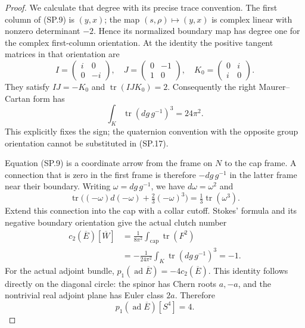 \begin{proof}
We calculate that degree with its precise trace convention. The
first column of (SP.9) is \((y,x)\); the map
\((s,\rho)\mapsto(y,x)\) is complex linear with nonzero
determinant \(-2\). Hence its normalized boundary map has degree
one for the complex first-column orientation. At the identity the
positive tangent matrices in that orientation are
\[
 I=\begin{pmatrix}i&0\\0&-i\end{pmatrix},\quad
 J=\begin{pmatrix}0&-1\\1&0\end{pmatrix},\quad
 K_0=\begin{pmatrix}0&i\\i&0\end{pmatrix}.
                                                               \tag{SP.16}
\]
They satisfy \(IJ=-K_0\) and \(\operatorname{tr}(IJK_0)=2\).
Consequently the right Maurer--Cartan form has
\[
           \int_K\operatorname{tr}(dg\,g^{-1})^3=24\pi^2.
                                                               \tag{SP.17}
\]
This explicitly fixes the sign; the quaternion convention with the
opposite group orientation cannot be substituted in (SP.17).

Equation (SP.9) is a coordinate arrow from the frame on \(N\) to
the cap frame. A connection that is zero in the first frame is
therefore \(-dg\,g^{-1}\) in the latter frame near their boundary.
Writing \(\omega=dg\,g^{-1}\), we have
\(d\omega=\omega^2\) and
\[
 \operatorname{tr}\bigl((-\omega)d(-\omega)
                    +\tfrac23(-\omega)^3\bigr)
                    =\tfrac13\operatorname{tr}(\omega^3).
\]
Extend this connection into the cap with a collar cutoff. Stokes'
formula and its negative boundary orientation give the actual
clutch number
\[
 \begin{aligned}
 c_2(\overline E)[\overline W]
    &=\frac1{8\pi^2}\int_{\text{cap}}\operatorname{tr}(F^2)\\
    &=-\frac1{24\pi^2}
                       \int_K\operatorname{tr}(dg\,g^{-1})^3=-1.
 \end{aligned}                                             \tag{SP.18}
\]
For the actual adjoint bundle,
\(p_1(\operatorname{ad}\overline E)=-4c_2(\overline E)\).
This identity follows directly on the diagonal circle: the spinor
has Chern roots \(a,-a\), and the nontrivial real adjoint plane has
Euler class \(2a\). Therefore
\[
             p_1(\operatorname{ad}\overline E)[S^4]=4.    \tag{SP.19}
\]


\end{proof}
